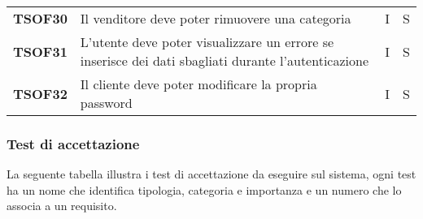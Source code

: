 \begin{center}
\begin{longtable}[!h]{p{60px} p{240px} p{35px} p{35px}}
        \textbf{TSOF30} & Il venditore deve poter rimuovere una categoria                                                     & I              & S              \\
        \textbf{TSOF31} & L'utente deve poter visualizzare un errore se inserisce dei dati sbagliati durante l'autenticazione & I              & S              \\
        \textbf{TSOF32} & Il cliente deve poter modificare la propria password                                                & I              & S              \\
    \end{longtable}
\end{center}
\pagebreak
\subsubsection{Test di accettazione}
La seguente tabella illustra i test di accettazione da eseguire sul sistema, ogni test ha un nome che identifica tipologia, categoria e importanza e un numero che lo associa a un requisito.
